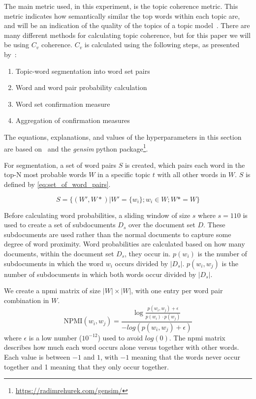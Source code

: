 The main metric used, in this experiment, is the topic coherence metric.
This metric indicates how semantically similar the top words within each topic are, and will be an indication of the quality of the topics of a topic model~\cite{topic_coherence_2015}.
There are many different methods for calculating topic coherence, but for this paper we will be using $C_v$ coherence.
$C_v$ is calculated using the following steps, as presented by~\citet{Syed2017coherence}:
\begin{enumerate}
	\item Topic-word segmentation into word set pairs
	\item Word and word pair probability calculation
	\item Word set confirmation measure
	\item Aggregation of confirmation measures
\end{enumerate}
The equations, explanations, and values of the hyperparameters in this section are based on~\citet{Syed2017coherence} and the \textit{gensim} python package\footnote{\url{https://radimrehurek.com/gensim/}}.

For segmentation, a set of word pairs $S$ is created, which pairs each word in the top-N most probable words $W$ in a specific topic $t$ with all other words in $W$.
$S$ is defined by \autoref{eq:set_of_word_pairs}.

\begin{equation}\label{eq:set_of_word_pairs}
	S = \{(W', W*)|W' = \{w_i\};w_i \in W;W* = W\}
\end{equation}

Before calculating word probabilities, a sliding window of size $s$ where $s =110$ is used to create a set of subdocuments $D_s$ over the document set $D$.
These subdocuments are used rather than the normal documents to capture some degree of word proximity.
Word probabilities are calculated based on how many documents, within the document set $D_s$, they occur in.
$p(w_i)$ is the number of subdocuments in which the word $w_i$ occurs divided by $|D_s|$.
$p(w_i, w_j)$ is the number of subdocuments in which both words occur divided by $|D_s|$. 

We create a \gls{npmi} matrix of size $|W|\times|W|$, with one entry per word pair combination in $W$.
\begin{equation}\label{eq:coherence_2}
	\text{NPMI}(w_i,w_j) =  \frac{\log\frac{p(w_i,w_j) + \epsilon}{p(w_i)\cdot p(w_j)}}{-log(p(w_i,w_j) + \epsilon)}
\end{equation}
\noindent where $\epsilon$ is a low number ($10^{-12}$) used to avoid $log(0)$.
The \gls{npmi} matrix describes how much each word occurs alone versus together with other words.
Each value is between $-1$ and $1$, with $-1$ meaning that the words never occur together and 1 meaning that they only occur together.

